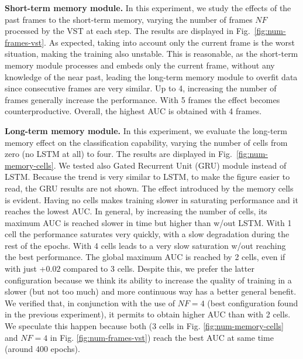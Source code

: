 \noindent\textbf{Short-term memory module.}
In this experiment, we study the effects of the past frames to the short-term memory, varying the number of frames $\mathit{NF}$ processed by the VST at each step.
The results are displayed in Fig.~\ref{fig:num-frames-vst}.
As expected, taking into account only the current frame is the worst situation, making the training also unstable.
This is reasonable, as the short-term memory module processes and embeds only the current frame, without any knowledge of the near past, leading the long-term memory module to overfit data since consecutive frames are very similar.
Up to 4, increasing the number of frames generally increase the performance.
With 5 frames the effect becomes counterproductive.
Overall, the highest AUC is obtained with 4 frames.

\noindent\textbf{Long-term memory module.}
In this experiment, we evaluate the long-term memory effect on the classification capability, varying the number of cells from zero (no LSTM at all) to four.
The results are displayed in Fig.~\ref{fig:num-memory-cells}.
We tested also Gated Recurrent Unit (GRU) module instead of LSTM.
Because the trend is very similar to LSTM, to make the figure easier to read, the GRU results are not shown.
The effect introduced by the memory cells is evident.
Having no cells makes training slower in saturating performance and it reaches the lowest AUC.
In general, by increasing the number of cells, its maximum AUC is reached slower in time but higher than w/out LSTM.
With 1 cell the performance saturates very quickly, with a slow degradation during the rest of the epochs.
With 4 cells leads to a very slow saturation w/out reaching the best performance.
The global maximum AUC is reached by 2 cells, even if with just +$0.02$ compared to 3 cells.
Despite this, we prefer the latter configuration because we think its ability to increase the quality of training in a slower (but not too much) and more continuous way has a better general benefit.
We verified that, in conjunction with the use of $\mathit{NF}=4$ (best configuration found in the previous experiment), it permits to obtain higher AUC than with 2 cells.
We speculate this happen because both (3 cells in Fig. \ref{fig:num-memory-cells} and $\mathit{NF}=4$ in Fig. \ref{fig:num-frames-vst}) reach the best AUC at same time (around 400 epochs).


